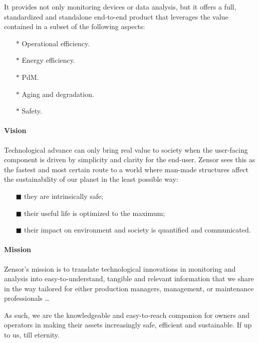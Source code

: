 It provides not only monitoring devices or data analysis, but it offers a full, standardized and standalone end-to-end product that leverages the value contained in a subset of the following aspects:
\begin{multicols}{2}
    \begin{itemize}
        \item[$\ast$] Operational efficiency.
        \item[$\ast$] Energy efficiency.
        \item[$\ast$] \acl{PdM}.
        \item[$\ast$] Aging and degradation.
        \item[$\ast$] Safety.
    \end{itemize}
\end{multicols}

\paragraph{Vision} 
Technological advance can only bring real value to society when the user-facing component is driven by simplicity and clarity for the end-user. 
Zensor sees this as the fastest and most certain route to a world where man-made structures affect the sustainability of our planet in the least possible way:
\begin{enumerate}
    \item[$\blacksquare$] they are intrinsically safe;
    \item[$\blacksquare$] their useful life is optimized to the maximum;
    \item[$\blacksquare$] their impact on environment and society is quantified and communicated.
\end{enumerate}

\paragraph{Mission}
Zensor's mission is to translate technological innovations in monitoring and analysis into easy-to-understand, tangible and relevant information that we share in the way tailored for either production managers,
management, or maintenance professionals \dots \par
As such, we are the knowledgeable and easy-to-reach companion for owners and operators in making their assets increasingly safe, efficient and sustainable. If up to us, till eternity.